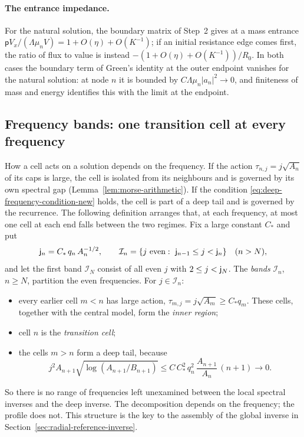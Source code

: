 \paragraph{The entrance impedance.}
For the natural solution, the boundary matrix of Step~2 gives at a
mass entrance
$\mathsf pV_x/(\Lambda\mu_nV)=1+O(\eta)+O(K^{-1})$; if an initial
resistance edge comes first, the ratio of flux to value is instead
$-(1+O(\eta)+O(K^{-1}))/R_0$. In both cases the boundary term of
Green's identity at the outer endpoint vanishes for the natural
solution: at node $n$ it is bounded by $C\Lambda\mu_n|a_n|^2\to0$,
and finiteness of mass and energy identifies this with the limit at
the endpoint.

\subsection{Frequency bands: one transition cell at every frequency}
\label{subsec:bands}

How a cell acts on a solution depends on the frequency. If the action
$\tau_{n,j}=j\sqrt{A_n}$ of its caps is large, the cell is isolated
from its neighbours and is governed by its own spectral gap
(Lemma~\ref{lem:morse-arithmetic}). If the condition
\eqref{eq:deep-frequency-condition-new} holds, the cell is part of a
deep tail and is governed by the recurrence. The following
definition arranges that, at each frequency, at most one cell at each
end falls between the two regimes. Fix a large constant $C_*$ and put
\begin{equation}\label{eq:rad-eq-rm21}
 \mathsf j_n=C_*\,q_n\,A_n^{-1/2},\qquad
 \mathcal I_n=\{j\ \text{even}:\ \mathsf j_{n-1}\le j<\mathsf j_n\}\quad(n>N),
\end{equation}
and let the first band $\mathcal I_N$ consist of all even $j$ with
$2\le j<\mathsf j_N$. The \emph{bands} $\mathcal I_n$, $n\ge N$, partition
the even frequencies. For $j\in\mathcal I_n$:
\begin{itemize}
\item every earlier cell $m<n$ has large action,
 $\tau_{m,j}=j\sqrt{A_m}\ge C_*q_m$. These cells, together with the
 central model, form the \emph{inner region};
\item cell $n$ is the \emph{transition cell};
\item the cells $m>n$ form a deep tail, because
 \begin{equation}\label{eq:rad-eq-rm22}
  j^2A_{n+1}\sqrt{\log(A_{n+1}/B_{n+1})}
  \le C\,C_*^2\,q_n^2\,\frac{A_{n+1}}{A_n}\,(n+1)\longrightarrow0 .
 \end{equation}
\end{itemize}
So there is no range of frequencies left unexamined between the local
spectral inverses and the deep inverse. The decomposition depends on
the frequency; the profile does not. This structure is the key to the
assembly of the global inverse in
Section~\ref{sec:radial-reference-inverse}.

